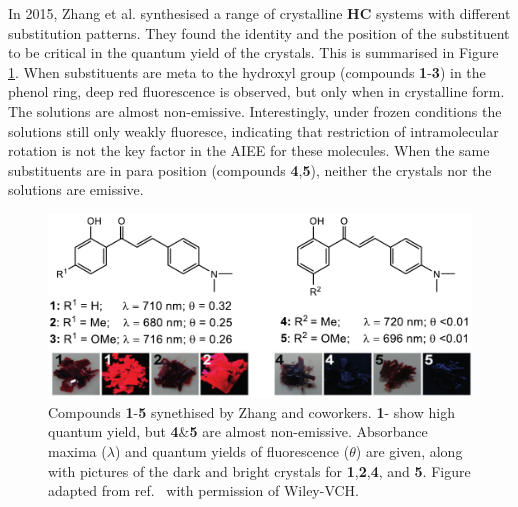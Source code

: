 In 2015, Zhang et al. synthesised a range of crystalline \textbf{HC} systems with different substitution patterns.\cite{Cheng2015} They found the identity and the position of the substituent to be critical in the quantum yield of the crystals. This is summarised in Figure \ref{figure: HC_experimental}. When substituents are meta to  the hydroxyl group (compounds \textbf{1}-\textbf{3}) in the phenol ring, deep red fluorescence is observed, but only when in crystalline form. The solutions are almost non-emissive. Interestingly, under frozen conditions the solutions still only weakly fluoresce, indicating that restriction of intramolecular rotation is not the key factor in the AIEE for these molecules. When the same substituents are in para position (compounds \textbf{4},\textbf{5}), neither the crystals nor the solutions are emissive. 
\begin{figure}[H]
\centering
  \includegraphics[width=0.95\linewidth]{Intro/HC_experimental.pdf}
  \caption[Emission behaviour of crystalline 2'-hydroxychalcone derivatives]{Compounds \textbf{1}-\textbf{5} synethised by Zhang and coworkers. \textbf{1}-\textbf{} show high quantum yield, but \textbf{4}\&\textbf{5} are almost non-emissive. Absorbance maxima ($\lambda$) and quantum yields of fluorescence ($\theta$) are given, along with pictures of the dark and bright crystals for \textbf{1},\textbf{2},\textbf{4}, and \textbf{5}. Figure adapted from ref.~ with permission of Wiley-VCH.}
  \label{figure: HC_experimental}
\end{figure}
